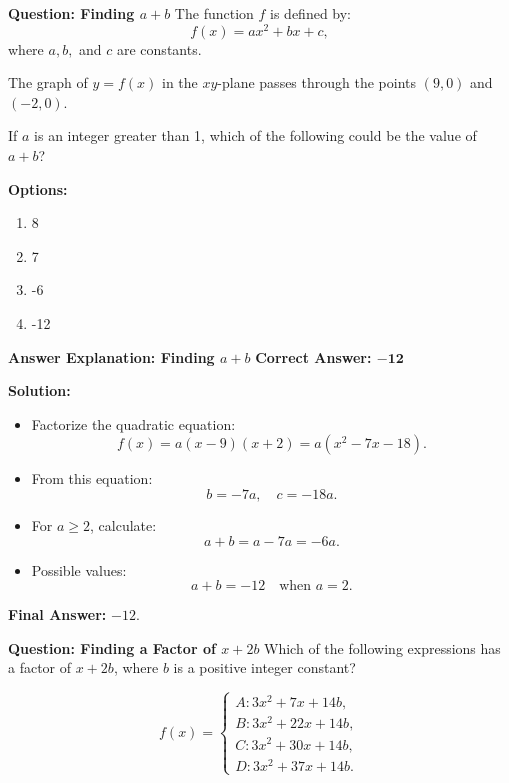 \documentclass{beamer}
\begin{document}
\begin{frame}{\textbf{Question: Finding \( a + b \)}}
    The function \( f \) is defined by:
    \[
    f(x) = ax^2 + bx + c,
    \]
    where \( a, b, \) and \( c \) are constants.  

    \vspace{0.3cm}
    The graph of \( y = f(x) \) in the \( xy \)-plane passes through the points \( (9,0) \) and \( (-2,0) \).  

    \vspace{0.3cm}
    If \( a \) is an integer greater than 1, which of the following could be the value of \( a + b \)?

    \vspace{0.5cm}
    \textbf{Options:}
    \begin{enumerate}
        \item[A] 8
        \item[B] 7
        \item[C] -6
        \item[D] -12
    \end{enumerate}
\end{frame}

\begin{frame}{\textbf{Answer Explanation: Finding \( a + b \)}}
    \textbf{Correct Answer: \textcolor{novelPurple}{\( \mathbf{-12} \)}}  

    \vspace{0.3cm}
    \textbf{Solution:}
    \begin{itemize}
        \item Factorize the quadratic equation:
        \[
        f(x) = a(x - 9)(x + 2) = a(x^2 - 7x - 18).
        \]
        \item From this equation:
        \[
        b = -7a, \quad c = -18a.
        \]
        \item For \( a \geq 2 \), calculate:
        \[
        a + b = a - 7a = -6a.
        \]
        \item Possible values:
        \[
        a + b = -12 \quad \text{when } a = 2.
        \]
    \end{itemize}
    \textbf{Final Answer:} \( \boxed{-12} \).
\end{frame}

\begin{frame}{\textbf{Question: Finding a Factor of \( x + 2b \)}}
    Which of the following expressions has a factor of \( x + 2b \), where \( b \) is a positive integer constant?

    \vspace{0.3cm}
    \[
    f(x) =
    \begin{cases} 
    A: 3x^2 + 7x + 14b, \\ 
    B: 3x^2 + 22x + 14b, \\ 
    C: 3x^2 + 30x + 14b, \\ 
    D: 3x^2 + 37x + 14b.
    \end{cases}
    \]
\end{frame}
\end{document}
